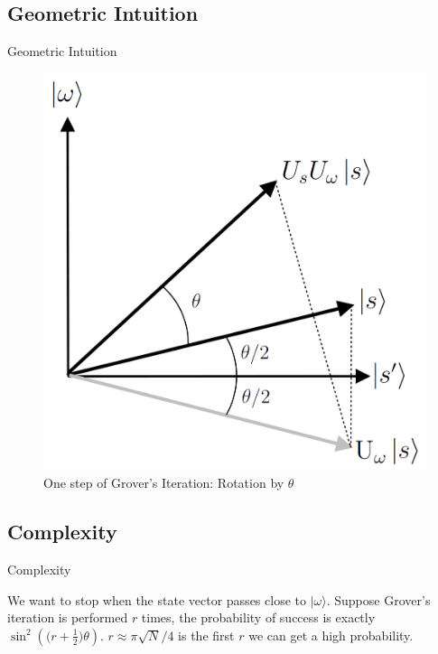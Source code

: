 \documentclass{beamer}
\newcommand{\<}{\langle}
\renewcommand{\>}{\rangle}
\begin{document}
\subsection{Geometric Intuition}
\begin{frame}{Geometric Intuition}

\begin{figure}
    \centering
    \includegraphics[width=0.5\columnwidth]{grover_geo.png}
    \caption{One step of Grover's Iteration: Rotation by $\theta$ }
    \label{fig:grover_geo}
\end{figure}

\end{frame}

\subsection{Complexity}
\begin{frame}{Complexity}

We want to stop when the state vector passes close to $|\omega \rangle$. \newline
Suppose Grover's iteration is performed $r$ times, the probability of success is exactly $\sin^2\left( \Big( r + \frac{1}{2} \Big)\theta\right)$. \newline
$r\approx \pi \sqrt {N}/4$ is the first $r$ we can get a high probability.

\end{frame}
\end{document}
